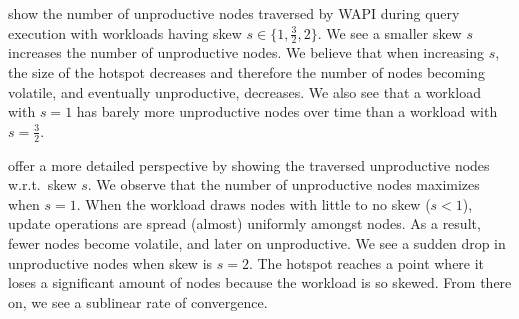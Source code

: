 \documentclass[abstracton,12pt]{scrartcl}
\theoremstyle{definition}
\begin{document}
 show the number
of unproductive nodes traversed by WAPI during query execution with workloads having skew
$s \in \{1,\frac{3}{2},2\}$.  We see a smaller
skew $s$ increases the number of unproductive nodes. We believe that when increasing $s$, 
the size of the hotspot decreases and therefore the number of nodes
becoming volatile, and eventually unproductive, decreases.
We also see that a workload with $s = 1$ has barely more unproductive nodes over time
than a workload with $s = \frac{3}{2}$.

 offer a more detailed
perspective by showing the traversed unproductive nodes w.r.t.\ skew $s$. 
We observe that the number of unproductive nodes maximizes when $s = 1$. When the
workload draws nodes with little to no skew ($s < 1$), update operations are
spread (almost) uniformly amongst nodes. As a result, fewer nodes become volatile,
and later on unproductive.
We see a sudden drop in unproductive nodes when skew is $s = 2$. 
The hotspot reaches a point where it loses a significant amount of nodes because the 
workload is so skewed. From there on, we see a sublinear rate of convergence. 


\end{document}
